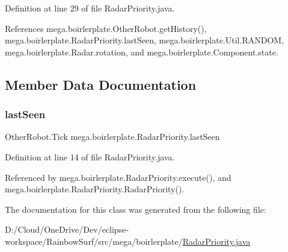 Definition at line 29 of file Radar\+Priority.\+java.



References mega.\+boirlerplate.\+Other\+Robot.\+get\+History(), mega.\+boirlerplate.\+Radar\+Priority.\+last\+Seen, mega.\+boirlerplate.\+Util.\+R\+A\+N\+D\+OM, mega.\+boirlerplate.\+Radar.\+rotation, and mega.\+boirlerplate.\+Component.\+state.



\subsection{Member Data Documentation}
\mbox{\label{classmega_1_1boirlerplate_1_1_radar_priority_aaec1525e375033dcfb5adc83457c76e6}} 
\subsubsection{\texorpdfstring{last\+Seen}{lastSeen}}
{\footnotesize\ttfamily Other\+Robot.\+Tick mega.\+boirlerplate.\+Radar\+Priority.\+last\+Seen\hspace{0.3cm}{\ttfamily [private]}}



Definition at line 14 of file Radar\+Priority.\+java.



Referenced by mega.\+boirlerplate.\+Radar\+Priority.\+execute(), and mega.\+boirlerplate.\+Radar\+Priority.\+Radar\+Priority().



The documentation for this class was generated from the following file\+:\begin{DoxyCompactItemize}
\item 
D\+:/\+Cloud/\+One\+Drive/\+Dev/eclipse-\/workspace/\+Rainbow\+Surf/src/mega/boirlerplate/\hyperlink{_radar_priority_8java}{Radar\+Priority.\+java}\end{DoxyCompactItemize}
